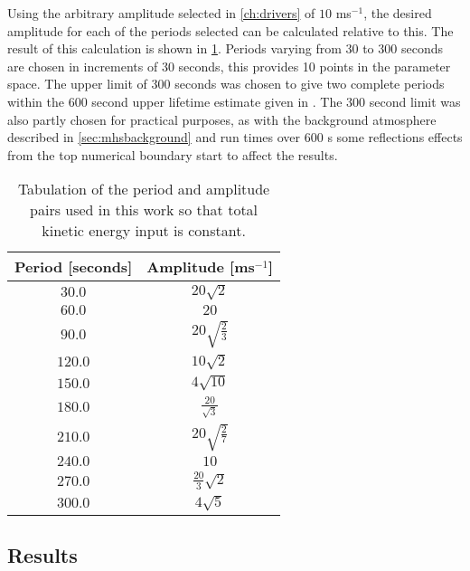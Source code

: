 Using the arbitrary amplitude selected in \cref{ch:drivers} of $10$ ms$^{-1}$, the desired amplitude for each of the periods selected can be calculated relative to this.
The result of this calculation is shown in \cref{tab:period-amp}.
Periods varying from $30$ to $300$ seconds are chosen in increments of $30$ seconds, this provides 10 points in the parameter space.
The upper limit of $300$ seconds was chosen to give two complete periods within the $600$ second upper lifetime estimate given in \cite{sanchezalmeida2004}.
The $300$ second limit was also partly chosen for practical purposes, as with the background atmosphere described in \cref{sec:mhsbackground} and run times over $600$ s some reflections effects from the top numerical boundary start to affect the results.


\begin{table}
    \centering
    \begin{tabular}{cc}
        Period [seconds] & Amplitude [ms$^{-1}$] 	\\ \hline
        $30.0$           & $20\sqrt{2}$           	\\[2ex]
        $60.0$           & $20$  		            \\[2ex]
        $90.0$           & $20\sqrt{\frac{2}{3}}$  \\[2ex]
        $120.0$          & $10\sqrt{2}$        	\\[2ex]
        $150.0$          & $4\sqrt{10}$            \\[2ex]
        $180.0$          & $\frac{20}{\sqrt{3}}$   \\[2ex]
        $210.0$          & $20\sqrt{\frac{2}{7}}$  \\[2ex]
        $240.0$          & $10$                 	\\[2ex]
        $270.0$          & $\frac{20}{3}\sqrt{2}$  \\[2ex]
        $300.0$          & $4\sqrt{5}$           	\\[2ex]
    \end{tabular}
    \caption{Tabulation of the period and amplitude pairs used in this work so that total kinetic energy input is constant.}
    \label{tab:period-amp}
\end{table}

\subsection{Results}\label{subsec:results}

